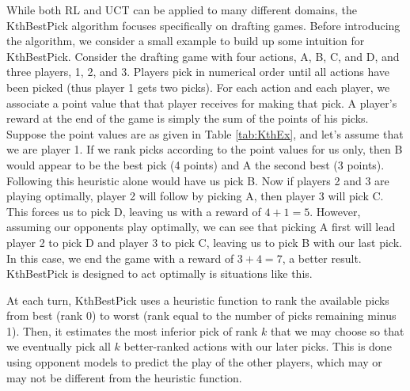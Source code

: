 \documentclass[letterpaper]{article}
\numberwithin{equation}{section}
\numberwithin{theorem}{section}
\numberwithin{lemma}{section}
\numberwithin{df}{section}
\begin{document}
While both RL and UCT can be applied to many different domains, the KthBestPick algorithm focuses specifically on drafting games.  Before introducing the algorithm, we consider a small example to build up some intuition for KthBestPick.  Consider the drafting game with four actions, A, B, C, and D, and three players, 1, 2, and 3.  Players pick in numerical order until all actions have been picked (thus player 1 gets two picks).  For each action and each player, we associate a point value that that player receives for making that pick.  A player's reward at the end of the game is simply the sum of the points of his picks.  Suppose the point values are as given in Table \ref{tab:KthEx}, and let's assume that we are player 1.  If we rank picks according to the point values for us only, then B would appear to be the best pick (4 points) and A the second best (3 points).  Following this heuristic alone would have us pick B.  Now if players 2 and 3 are playing optimally, player 2 will follow by picking A, then player 3 will pick C.  This forces us to pick D, leaving us with a reward of $4 + 1 = 5$.  However, assuming our opponents play optimally, we can see that picking A first will lead player 2 to pick D and player 3 to pick C, leaving us to pick B with our last pick.  In this case, we end the game with a reward of $3 + 4 = 7$, a better result.  KthBestPick is designed to act optimally is situations like this.

At each turn, KthBestPick uses a heuristic function to rank the available picks from best (rank 0) to worst (rank equal to the number of picks remaining minus 1).  Then, it estimates the most inferior pick of rank $k$ that we may choose so that we eventually pick all $k$ better-ranked actions with our later picks.  This is done using opponent models to predict the play of the other players, which may or may not be different from the heuristic function.
\end{document}
